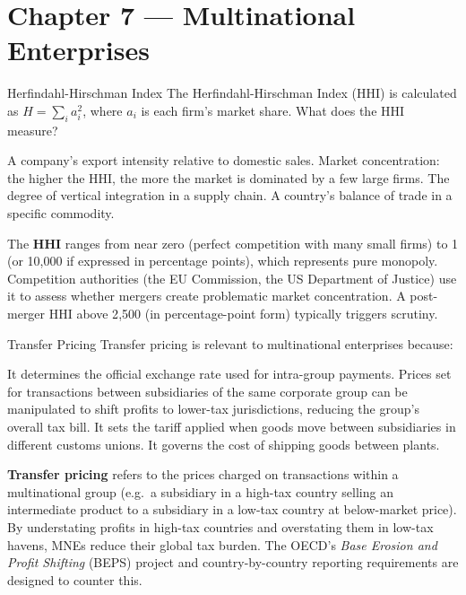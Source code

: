 \documentclass[paper=a5]{scrartcl}
\begin{document}
\section{Chapter 7 — Multinational Enterprises}

\begin{question}[type=mc]{Herfindahl-Hirschman Index}
The Herfindahl-Hirschman Index (HHI) is calculated as $H = \sum_i a_i^2$,
where $a_i$ is each firm's market share. What does the HHI measure?
\begin{choices}
  \choice        A company's export intensity relative to domestic sales.
  \correctchoice Market concentration: the higher the HHI, the more the
                 market is dominated by a few large firms.
  \choice        The degree of vertical integration in a supply chain.
  \choice        A country's balance of trade in a specific commodity.
\end{choices}
\begin{solution}
  The \textbf{HHI} ranges from near zero (perfect competition with many
  small firms) to 1 (or 10{,}000 if expressed in percentage points), which
  represents pure monopoly. Competition authorities (the EU Commission,
  the US Department of Justice) use it to assess whether mergers create
  problematic market concentration. A post-merger HHI above 2{,}500 (in
  percentage-point form) typically triggers scrutiny.
\end{solution}
\end{question}

\begin{question}[type=mc]{Transfer Pricing}
Transfer pricing is relevant to multinational enterprises because:
\begin{choices}
  \choice        It determines the official exchange rate used for
                 intra-group payments.
  \correctchoice Prices set for transactions between subsidiaries of the
                 same corporate group can be manipulated to shift profits to
                 lower-tax jurisdictions, reducing the group's overall tax
                 bill.
  \choice        It sets the tariff applied when goods move between
                 subsidiaries in different customs unions.
  \choice        It governs the cost of shipping goods between plants.
\end{choices}
\begin{solution}
  \textbf{Transfer pricing} refers to the prices charged on transactions
  within a multinational group (e.g.\ a subsidiary in a high-tax country
  selling an intermediate product to a subsidiary in a low-tax country at
  below-market price). By understating profits in high-tax countries and
  overstating them in low-tax havens, MNEs reduce their global tax burden.
  The OECD's \emph{Base Erosion and Profit Shifting} (BEPS) project and
  country-by-country reporting requirements are designed to counter this.
\end{solution}
\end{question}
\end{document}
